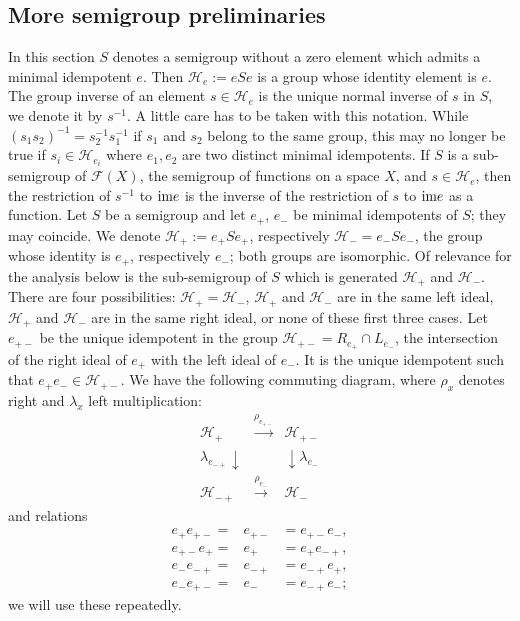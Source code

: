 \documentclass[10pt,a4paper]{amsart}
\numberwithin{equation}{section}
\newcommand{\Ff}{{\mathcal F}}
\newcommand{\Hh}{{\mathcal H}}
\newcommand{\im}{\mbox{\rm im}}
\begin{document}
\subsection{More semigroup preliminaries}\label{preliminaries}
%
In this section $S$ denotes a semigroup without a zero element which admits a minimal idempotent $e$. Then $\Hh_e := e S e$ is a group whose identity element is $e$. The group inverse of an element $s\in \Hh_e$ is the unique normal inverse of $s$ in $S$, 
we denote it by $s^{-1}$. A little care has to be taken with this notation. 
While $(s_1s_2)^{-1} = s_2^{-1} s_1^{-1}$ if $s_1$ and $s_2$ belong to the same group, this may no longer be true if $s_i \in \Hh_{e_i}$ where $e_1,e_2$ are two distinct minimal idempotents. If $S$ is a sub-semigroup of $\Ff(X)$, the semigroup of functions on a space $X$, and $s\in\Hh_e$, then the restriction of $s^{-1}$ to
  $\im e$  is the inverse of the restriction of $s$ to $\im e$ as a function.
Let $S$ be a semigroup %
and let $e_+$, $e_-$ be minimal idempotents of $S$; they may coincide. 
We denote $\Hh_{+}:=e_+S e_+$, respectively $\Hh_{-}=e_-Se_-$,  the group whose identity is $e_+$, respectively $e_-$; both groups are isomorphic. Of relevance for the analysis below is the sub-semigroup of $S$ which is generated $\Hh_{+}$ and $\Hh_{-}$. There are four possibilities: $\Hh_{+}=\Hh_{-}$, $\Hh_+$ and $\Hh_-$ are in the same left ideal, $\Hh_+$ and $\Hh_-$ are in the same right ideal, or none of these first three cases. Let $e_{+-}$ be the unique idempotent in the group $\Hh_{{+-}}=R_{e_+}\cap L_{e_-}$, the intersection of the right ideal of $e_+$ with the left ideal of $e_-$.  It is the unique idempotent such that $e_+e_-\in \Hh_{{+-}}$. We have the following commuting diagram, where $\rho_x$ denotes right and $\lambda_x$ left multiplication: 
\[
\begin{array}{rcl}
\Hh_+  & \stackrel{\rho_{e_{+-}}} \longrightarrow & \Hh_{+-}\\
\lambda_{e_{-+}} \downarrow & & \downarrow \lambda_{e_{-}} \\
\Hh_{-+}  & \stackrel{\rho_{e_{-}}} \longrightarrow & \Hh_{-}
\end{array}
\]
and relations
\begin{eqnarray*}
e_+ e_{+-} = &e_{+-}& = e_{+-}e_- , \\ e_{+-} e_{+} = &e_+& = e_{+}e_{-+} ,  \\ e_{-}e_{-+}  = &e_{-+} &= e_{-+}e_{+} , \\
e_{-} e_{+-} = &e_{-}& = e_{-+}e_{-};
\end{eqnarray*}
we will use these repeatedly.
\end{document}

